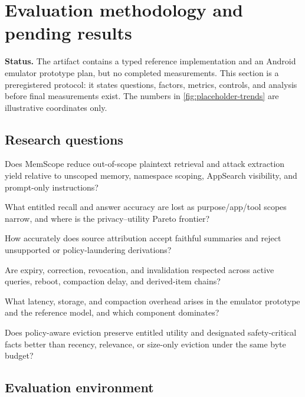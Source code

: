 \section{Evaluation methodology and pending results}
\label{sec:evaluation}

\textbf{Status.} \placeholder{} The artifact contains a typed reference implementation and an Android emulator prototype plan, but no completed measurements. This section is a preregistered protocol: it states questions, factors, metrics, controls, and analysis before final measurements exist. The numbers in \cref{fig:placeholder-trends} are illustrative coordinates only.

\subsection{Research questions}

\begin{description}[leftmargin=13mm,style=nextline]
  \item[RQ1: Enforcement.] Does MemScope reduce out-of-scope plaintext retrieval and attack extraction yield relative to unscoped memory, namespace scoping, AppSearch visibility, and prompt-only instructions?
  \item[RQ2: Utility.] What entitled recall and answer accuracy are lost as purpose/app/tool scopes narrow, and where is the privacy--utility Pareto frontier?
  \item[RQ3: Derivation.] How accurately does source attribution accept faithful summaries and reject unsupported or policy-laundering derivations?
  \item[RQ4: Lifecycle.] Are expiry, correction, revocation, and invalidation respected across active queries, reboot, compaction delay, and derived-item chains?
  \item[RQ5: System cost.] What latency, storage, and compaction overhead arises in the emulator prototype and the reference model, and which component dominates?
  \item[RQ6: Retention.] Does policy-aware eviction preserve entitled utility and designated safety-critical facts better than recency, relevance, or size-only eviction under the same byte budget?
\end{description}



\subsection{Evaluation environment}

